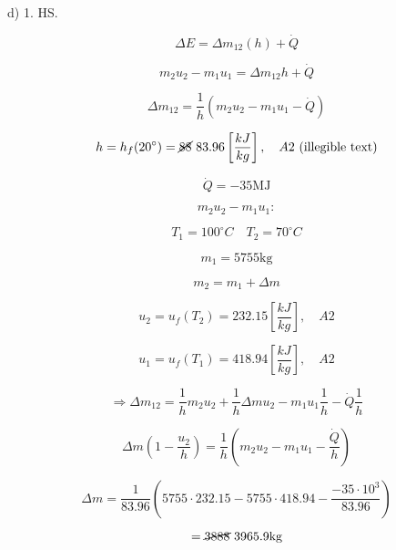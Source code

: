d) 1. HS.

\[
\Delta E = \Delta m_{12}(h) + \dot{Q}
\]

\[
m_2 u_2 - m_1 u_1 = \Delta m_{12} h + \dot{Q}
\]

\[
\Delta m_{12} = \frac{1}{h} (m_2 u_2 - m_1 u_1 - \dot{Q})
\]

\[
h = h_f(20^\circ) = \cancel{88} \ 83.96 \left[\frac{kJ}{kg}\right], \quad A2 \ (\text{illegible text})
\]

\[
\dot{Q} = -35 \text{MJ}
\]

\[
m_2 u_2 - m_1 u_1:
\]

\[
T_1 = 100^\circ C \quad T_2 = 70^\circ C
\]

\[
m_1 = 5755 \text{kg}
\]

\[
m_2 = m_1 + \Delta m
\]

\[
u_2 = u_f(T_2) = 232.15 \left[\frac{kJ}{kg}\right], \quad A2
\]

\[
u_1 = u_f(T_1) = 418.94 \left[\frac{kJ}{kg}\right], \quad A2
\]

\[
\Rightarrow \Delta m_{12} = \frac{1}{h} m_2 u_2 + \frac{1}{h} \Delta m u_2 - m_1 u_1 \frac{1}{h} - \dot{Q} \frac{1}{h}
\]

\[
\Delta m \left(1 - \frac{u_2}{h}\right) = \frac{1}{h} (m_2 u_2 - m_1 u_1 - \frac{\dot{Q}}{h})
\]

\[
\Delta m = \frac{1}{83.96} (5755 \cdot 232.15 - 5755 \cdot 418.94 - \frac{-35 \cdot 10^3}{83.96})
\]

\[
= \cancel{3888} \ 3965.9 \text{kg}
\]